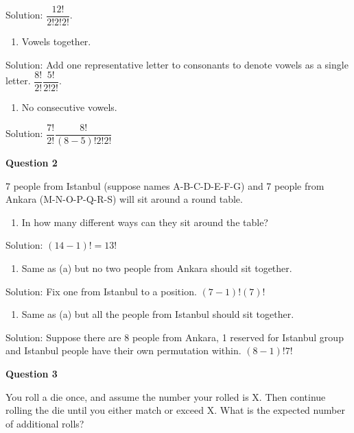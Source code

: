 \documentclass[]{book}
\providecommand{\tightlist}{%
  \setlength{\itemsep}{0pt}\setlength{\parskip}{0pt}}
\theoremstyle{definition}
\theoremstyle{definition}
\theoremstyle{definition}
\theoremstyle{remark}
\begin{document}
Solution: \(\dfrac{12!}{2!2!2!}\).

\begin{enumerate}
\def\labelenumi{\alph{enumi})}
\setcounter{enumi}{1}
\tightlist
\item
  Vowels together.
\end{enumerate}

Solution: Add one representative letter to consonants to denote vowels
as a single letter. \(\dfrac{8!}{2!}\dfrac{5!}{2!2!}\).

\begin{enumerate}
\def\labelenumi{\alph{enumi})}
\setcounter{enumi}{2}
\tightlist
\item
  No consecutive vowels.
\end{enumerate}

Solution: \(\dfrac{7!}{2!}\dfrac{8!}{(8-5)!2!2!}\)

\textbf{Question 2}

7 people from Istanbul (suppose names A-B-C-D-E-F-G) and 7 people from
Ankara (M-N-O-P-Q-R-S) will sit around a round table.

\begin{enumerate}
\def\labelenumi{\alph{enumi})}
\tightlist
\item
  In how many different ways can they sit around the table?
\end{enumerate}

Solution: \((14-1)! = 13!\)

\begin{enumerate}
\def\labelenumi{\alph{enumi})}
\setcounter{enumi}{1}
\tightlist
\item
  Same as (a) but no two people from Ankara should sit together.
\end{enumerate}

Solution: Fix one from Istanbul to a position. \((7-1)!(7)!\)

\begin{enumerate}
\def\labelenumi{\alph{enumi})}
\setcounter{enumi}{2}
\tightlist
\item
  Same as (a) but all the people from Istanbul should sit together.
\end{enumerate}

Solution: Suppose there are 8 people from Ankara, 1 reserved for
Istanbul group and Istanbul people have their own permutation within.
\((8-1)!7!\)

\textbf{Question 3}

You roll a die once, and assume the number your rolled is X. Then
continue rolling the die until you either match or exceed X. What is the
expected number of additional rolls?
\end{document}
